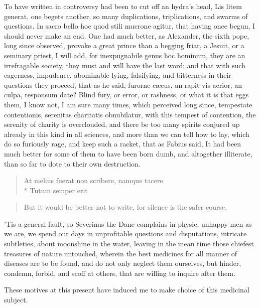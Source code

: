 {To have written in controversy had been to cut off an hydra's head,
Lis litem generat, one begets another, so many duplications,
triplications, and swarms of questions. In sacro bello hoc quod stili
mucrone agitur, that having once begun, I should never make an end. One
had much better, as Alexander, the sixth pope, long since
observed, provoke a great prince than a begging friar, a Jesuit, or a
seminary priest, I will add, for inexpugnabile genus hoc hominum, they
are an irrefragable society, they must and will have the last word; and
that with such eagerness, impudence, abominable lying, falsifying, and
bitterness in their questions they proceed, that as he said,
furorne c\ae{}cus, an rapit vis acrior, an culpa, responsum date? Blind
fury, or error, or rashness, or what it is that eggs them, I know not,
I am sure many times, which \Austin{} perceived long since,
tempestate contentionis, serenitas charitatis obnubilatur, with this
tempest of contention, the serenity of charity is overclouded, and
there be too many spirits conjured up already in this kind in all
sciences, and more than we can tell how to lay, which do so furiously
rage, and keep such a racket, that as Fabius said, It had been
much better for some of them to have been born dumb, and altogether
illiterate, than so far to dote to their own destruction.
%
\begin{latin}
\begin{verse}
At melius fuerat non scribere, namque tacere\\*
Tutum semper erit
\end{verse}
\end{latin}
\translationrule%
\begin{verse}%
But it would be better not to write,
for silence is the safer course.
\end{verse}%

'Tis a general fault, so Severinus the Dane complains in physic,
unhappy men as we are, we spend our days in unprofitable questions and
disputations, intricate subtleties,  about moonshine in
the water, leaving in the mean time those chiefest treasures of nature
untouched, wherein the best medicines for all manner of diseases are to
be found, and do not only neglect them ourselves, but hinder, condemn,
forbid, and scoff at others, that are willing to inquire after them.

These motives at this present have induced me to make choice of this
medicinal subject.

}
